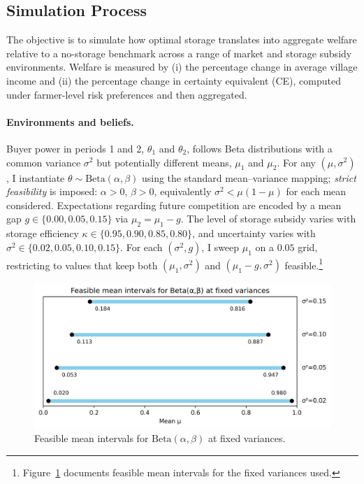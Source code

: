 \subsection{Simulation Process}
The objective is to simulate how optimal storage translates into aggregate welfare relative to a no-storage benchmark across a range of market and storage subsidy environments. Welfare is measured by (i) the percentage change in average village income and (ii) the percentage change in certainty equivalent (CE), computed under farmer-level risk preferences and then aggregated.

\paragraph{Environments and beliefs.}
Buyer power in periods 1 and 2, $\theta_1$ and $\theta_2$, follows Beta distributions with a common variance $\sigma^2$ but potentially different means, $\mu_1$ and $\mu_2$. For any $(\mu,\sigma^2)$, I instantiate $\theta\sim\text{Beta}(\alpha,\beta)$ using the standard mean--variance mapping; \emph{strict feasibility} is imposed: $\alpha>0$, $\beta>0$, equivalently $\sigma^2<\mu(1-\mu)$ for each mean considered. Expectations regarding future competition are encoded by a mean gap $g\in\{0.00,0.05,0.15\}$ via $\mu_2=\mu_1-g$. The level of storage subsidy varies with storage efficiency $\kappa\in\{0.95,0.90,0.85,0.80\}$, and uncertainty varies with $\sigma^2\in\{0.02, 0.05,0.10,0.15\}$. For each $(\sigma^2,g)$, I sweep $\mu_1$ on a $0.05$ grid, restricting to values that keep both $(\mu_1,\sigma^2)$ and $(\mu_1-g,\sigma^2)$ feasible.\footnote{Figure~\ref{fig:parameter_range_Beta_distribution} documents feasible mean intervals for the fixed variances used.} 

\begin{figure}[ht!]
    \centering
    \includegraphics[width=0.90\linewidth]{model_figures/parameter_range_Beta_distribution.png}
    \caption{Feasible mean intervals for $\text{Beta}(\alpha,\beta)$ at fixed variances.}
    \label{fig:parameter_range_Beta_distribution}
\end{figure}


